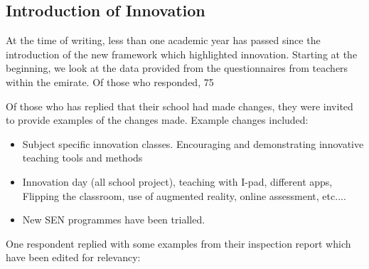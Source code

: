 \subsection{Introduction of Innovation}
At the time of writing, less than one academic year has passed since the introduction of the new framework which highlighted innovation. Starting at the beginning, we look at the data provided from the questionnaires from teachers within the emirate. Of those who responded, 75%

Of those who has replied that their school had made changes, they were invited to provide examples of the changes made. Example changes included:

\begin{itemize}
\item Subject specific innovation classes. Encouraging and demonstrating innovative teaching tools and methods
\item Innovation day (all school project), teaching with I-pad, different apps, Flipping the classroom, use of augmented reality, online assessment, etc....
\item New SEN programmes have been trialled.
\end{itemize}

One respondent replied with some examples from their inspection report which have been edited for relevancy:

